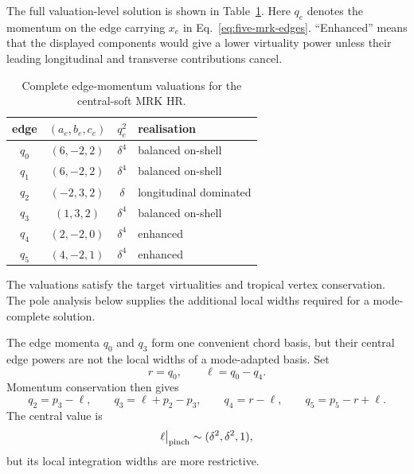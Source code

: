 \documentclass[a4paper,11pt]{article}
\begin{document}
The full valuation-level solution is shown in
Table~\ref{tab:five-mrk-edge-flow}.  Here \(q_e\) denotes the momentum on the
edge carrying \(x_e\) in Eq.~\eqref{eq:five-mrk-edges}.  ``Enhanced'' means
that the displayed components would give a lower virtuality power unless
their leading longitudinal and transverse contributions cancel.
\begin{table}[H]
\centering
\small
\begin{tabular}{@{}c c c l@{}}
\toprule
edge & \((a_e,b_e,c_e)\) & \(q_e^2\) & realisation\\
\midrule
\(q_0\) & \((6,-2,2)\) & \(\delta^4\) & balanced on-shell\\
\(q_1\) & \((6,-2,2)\) & \(\delta^4\) & balanced on-shell\\
\(q_2\) & \((-2,3,2)\) & \(\delta\) & longitudinal dominated\\
\(q_3\) & \((1,3,2)\) & \(\delta^4\) & balanced on-shell\\
\(q_4\) & \((2,-2,0)\) & \(\delta^4\) & enhanced\\
\(q_5\) & \((4,-2,1)\) & \(\delta^4\) & enhanced\\
\bottomrule
\end{tabular}
\caption{Complete edge-momentum valuations for the central-soft MRK HR.}
\label{tab:five-mrk-edge-flow}
\end{table}
The valuations satisfy the target virtualities and tropical vertex
conservation.  The pole analysis below supplies the additional local widths
required for a mode-complete solution.

The edge momenta \(q_0\) and \(q_3\) form one convenient chord basis, but
their central edge powers are not the local widths of a mode-adapted basis.
Set
\begin{equation}
 r=q_0,\qquad \ell=q_0-q_4.
 \label{eq:five-mrk-glauber-rerouting}
\end{equation}
Momentum conservation then gives
\begin{equation}
 q_2=p_3-\ell,\qquad q_3=\ell+p_2-p_3,
 \qquad q_4=r-\ell,\qquad q_5=p_5-r+\ell.
 \label{eq:five-mrk-mode-routing}
\end{equation}
The central value is
\begin{equation}
 \ell\big|_{\rm pinch}\sim(\delta^2,\delta^2,1),
 \label{eq:five-mrk-glauber-value}
\end{equation}
but its local integration widths are more restrictive.
\end{document}
